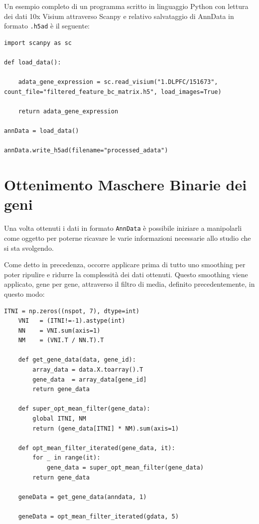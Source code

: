 Un esempio completo di un programma scritto in linguaggio Python con lettura dei dati 10x Visium attraverso Scanpy e 
relativo salvataggio di AnnData in formato \texttt{.h5ad} è il seguente:

\begin{lstlisting}[style=mypython, caption={Funzione per caricare il file \texttt{.h5} ed esempio su come utilizzarla per inizializzare oggetto \texttt{AnnData}}]
import scanpy as sc

def load_data():
    
    adata_gene_expression = sc.read_visium("1.DLPFC/151673", count_file="filtered_feature_bc_matrix.h5", load_images=True)
    
    return adata_gene_expression

annData = load_data()

annData.write_h5ad(filename="processed_adata")
\end{lstlisting}

\section{Ottenimento Maschere Binarie dei geni}\label{cap:BinaryMasks}
Una volta ottenuti i dati in formato \texttt{AnnData} è possibile iniziare a manipolarli come oggetto per poterne ricavare le varie informazioni 
necessarie allo studio che si sta svolgendo.

Come detto in precedenza, occorre applicare prima di tutto uno smoothing per poter ripulire e ridurre la complessità dei dati ottenuti.
Questo smoothing viene applicato, gene per gene, attraverso il filtro di media, definito precedentemente, in questo modo:
\begin{lstlisting}[style=mypython,label=code:MeanFilter,caption={Funzioni per ottenere i dati di un gene specifico e applicarci il filtro di media}]
	ITNI = np.zeros((nspot, 7), dtype=int)
	VNI   = (ITNI!=-1).astype(int)
    NN    = VNI.sum(axis=1)
    NM    = (VNI.T / NN.T).T

	def get_gene_data(data, gene_id):
		array_data = data.X.toarray().T
		gene_data  = array_data[gene_id]
		return gene_data
	
	def super_opt_mean_filter(gene_data):
		global ITNI, NM
		return (gene_data[ITNI] * NM).sum(axis=1)

	def opt_mean_filter_iterated(gene_data, it):
		for _ in range(it):
			gene_data = super_opt_mean_filter(gene_data)
		return gene_data
	
	geneData = get_gene_data(anndata, 1)

	geneData = opt_mean_filter_iterated(gdata, 5)
\end{lstlisting}

